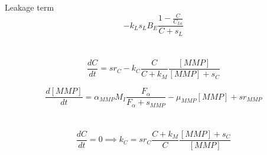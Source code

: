 \documentclass{article}
\begin{document}
Leakage term
	\begin{equation}
		-k_L s_L B_E \frac{1 - \frac{C}{C_{La}}}{C + s_L}
	\end{equation}
	\\
	\\
	\begin{equation}
		\frac{dC}{dt} =  sr_{C} -  k_C \frac{C}{C+k_M} \frac{[MMP]}{[MMP] +s_{C}}
	\end{equation}

	\begin{equation}
		\frac{d[MMP]}{dt} =  \alpha_{MMP} M_I \frac{F_\alpha}{F_\alpha + s_{MMP}} - \mu_{MMP}[MMP] + sr_{MMP}
	\end{equation}
	\\
	\\
	\begin{equation}
		\frac{dC}{dt} = 0 \implies k_C  = sr_{C} \frac{C + k_M}{C} \frac{[MMP] +s_{C}}{[MMP]}
	\end{equation}
\end{document}
